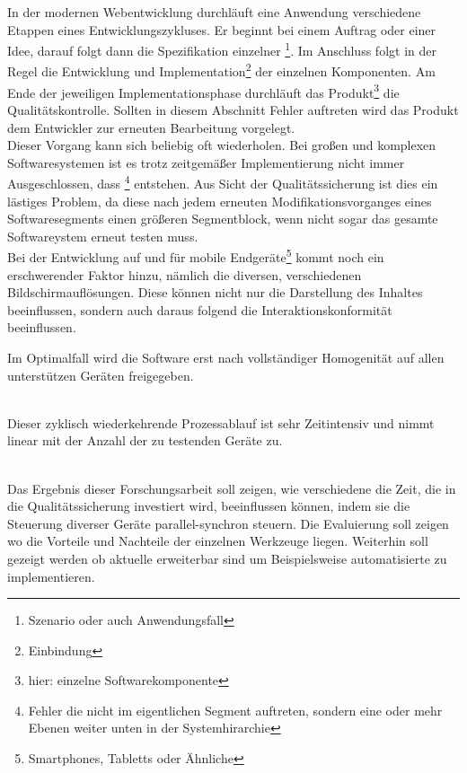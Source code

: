 In der modernen Webentwicklung durchläuft eine Anwendung verschiedene Etappen eines Entwicklungszykluses. Er beginnt bei einem Auftrag oder einer Idee, darauf folgt dann die Spezifikation einzelner \footnote{Szenario oder auch Anwendungsfall}. Im Anschluss folgt in der Regel die Entwicklung und Implementation\footnote{Einbindung} der einzelnen Komponenten. Am Ende der jeweiligen Implementationsphase durchläuft das Produkt\footnote{hier: einzelne Softwarekomponente} die Qualitätskontrolle. Sollten in diesem Abschnitt Fehler auftreten wird das Produkt dem Entwickler zur erneuten Bearbeitung vorgelegt. 
\\
Dieser Vorgang kann sich beliebig oft wiederholen. Bei großen und komplexen Softwaresystemen ist es trotz zeitgemäßer Implementierung nicht immer Ausgeschlossen, dass \footnote{Fehler die nicht im eigentlichen Segment auftreten, sondern eine oder mehr Ebenen weiter unten in der Systemhirarchie} entstehen. Aus Sicht der Qualitätssicherung ist dies ein lästiges Problem, da diese nach jedem erneuten Modifikationsvorganges eines Softwaresegments einen größeren Segmentblock, wenn nicht sogar das gesamte Softwareystem erneut testen muss.
\\
Bei der Entwicklung auf und für mobile Endgeräte\footnote{Smartphones, Tabletts  oder Ähnliche} kommt noch ein erschwerender Faktor hinzu, nämlich die diversen, verschiedenen Bildschirmauflösungen. Diese können nicht nur die Darstellung des Inhaltes beeinflussen, sondern auch daraus folgend die Interaktionskonformität beeinflussen.


Im Optimalfall wird die Software erst nach vollständiger Homogenität auf allen unterstützen Geräten freigegeben.

\\
Dieser zyklisch wiederkehrende Prozessablauf ist sehr Zeitintensiv und nimmt linear mit der Anzahl der zu testenden Geräte zu.

\\
Das Ergebnis dieser Forschungsarbeit soll zeigen, wie verschiedene  die Zeit, die in die Qualitätssicherung investiert wird, beeinflussen können, indem sie die Steuerung diverser Geräte parallel-synchron steuern. Die Evaluierung soll zeigen wo die Vorteile und Nachteile der einzelnen Werkzeuge liegen. Weiterhin soll gezeigt werden ob aktuelle  erweiterbar sind um Beispielsweise automatisierte  zu implementieren. 

